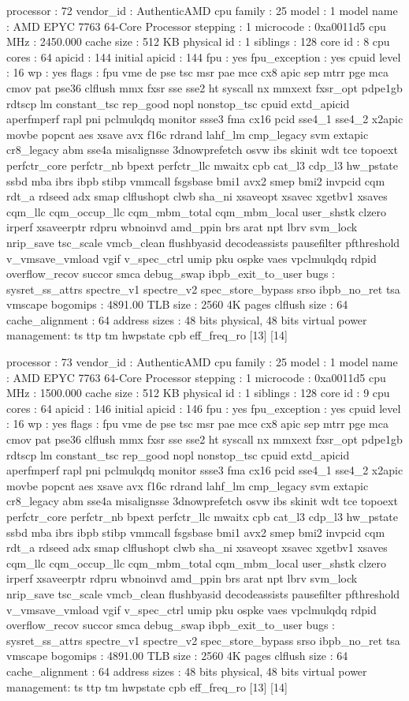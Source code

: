 processor	: 72
vendor_id	: AuthenticAMD
cpu family	: 25
model		: 1
model name	: AMD EPYC 7763 64-Core Processor
stepping	: 1
microcode	: 0xa0011d5
cpu MHz		: 2450.000
cache size	: 512 KB
physical id	: 1
siblings	: 128
core id		: 8
cpu cores	: 64
apicid		: 144
initial apicid	: 144
fpu		: yes
fpu_exception	: yes
cpuid level	: 16
wp		: yes
flags		: fpu vme de pse tsc msr pae mce cx8 apic sep mtrr pge mca cmov pat pse36 clflush mmx fxsr sse sse2 ht syscall nx mmxext fxsr_opt pdpe1gb rdtscp lm constant_tsc rep_good nopl nonstop_tsc cpuid extd_apicid aperfmperf rapl pni pclmulqdq monitor ssse3 fma cx16 pcid sse4_1 sse4_2 x2apic movbe popcnt aes xsave avx f16c rdrand lahf_lm cmp_legacy svm extapic cr8_legacy abm sse4a misalignsse 3dnowprefetch osvw ibs skinit wdt tce topoext perfctr_core perfctr_nb bpext perfctr_llc mwaitx cpb cat_l3 cdp_l3 hw_pstate ssbd mba ibrs ibpb stibp vmmcall fsgsbase bmi1 avx2 smep bmi2 invpcid cqm rdt_a rdseed adx smap clflushopt clwb sha_ni xsaveopt xsavec xgetbv1 xsaves cqm_llc cqm_occup_llc cqm_mbm_total cqm_mbm_local user_shstk clzero irperf xsaveerptr rdpru wbnoinvd amd_ppin brs arat npt lbrv svm_lock nrip_save tsc_scale vmcb_clean flushbyasid decodeassists pausefilter pfthreshold v_vmsave_vmload vgif v_spec_ctrl umip pku ospke vaes vpclmulqdq rdpid overflow_recov succor smca debug_swap ibpb_exit_to_user
bugs		: sysret_ss_attrs spectre_v1 spectre_v2 spec_store_bypass srso ibpb_no_ret tsa vmscape
bogomips	: 4891.00
TLB size	: 2560 4K pages
clflush size	: 64
cache_alignment	: 64
address sizes	: 48 bits physical, 48 bits virtual
power management: ts ttp tm hwpstate cpb eff_freq_ro [13] [14]

processor	: 73
vendor_id	: AuthenticAMD
cpu family	: 25
model		: 1
model name	: AMD EPYC 7763 64-Core Processor
stepping	: 1
microcode	: 0xa0011d5
cpu MHz		: 1500.000
cache size	: 512 KB
physical id	: 1
siblings	: 128
core id		: 9
cpu cores	: 64
apicid		: 146
initial apicid	: 146
fpu		: yes
fpu_exception	: yes
cpuid level	: 16
wp		: yes
flags		: fpu vme de pse tsc msr pae mce cx8 apic sep mtrr pge mca cmov pat pse36 clflush mmx fxsr sse sse2 ht syscall nx mmxext fxsr_opt pdpe1gb rdtscp lm constant_tsc rep_good nopl nonstop_tsc cpuid extd_apicid aperfmperf rapl pni pclmulqdq monitor ssse3 fma cx16 pcid sse4_1 sse4_2 x2apic movbe popcnt aes xsave avx f16c rdrand lahf_lm cmp_legacy svm extapic cr8_legacy abm sse4a misalignsse 3dnowprefetch osvw ibs skinit wdt tce topoext perfctr_core perfctr_nb bpext perfctr_llc mwaitx cpb cat_l3 cdp_l3 hw_pstate ssbd mba ibrs ibpb stibp vmmcall fsgsbase bmi1 avx2 smep bmi2 invpcid cqm rdt_a rdseed adx smap clflushopt clwb sha_ni xsaveopt xsavec xgetbv1 xsaves cqm_llc cqm_occup_llc cqm_mbm_total cqm_mbm_local user_shstk clzero irperf xsaveerptr rdpru wbnoinvd amd_ppin brs arat npt lbrv svm_lock nrip_save tsc_scale vmcb_clean flushbyasid decodeassists pausefilter pfthreshold v_vmsave_vmload vgif v_spec_ctrl umip pku ospke vaes vpclmulqdq rdpid overflow_recov succor smca debug_swap ibpb_exit_to_user
bugs		: sysret_ss_attrs spectre_v1 spectre_v2 spec_store_bypass srso ibpb_no_ret tsa vmscape
bogomips	: 4891.00
TLB size	: 2560 4K pages
clflush size	: 64
cache_alignment	: 64
address sizes	: 48 bits physical, 48 bits virtual
power management: ts ttp tm hwpstate cpb eff_freq_ro [13] [14]

